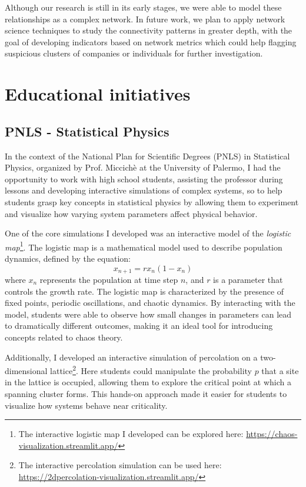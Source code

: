 \documentclass[a4paper, 10pt]{scrartcl}
\begin{document}
Although our research is still in its early stages, we were able to model these relationships as a complex network. In future work, we plan to apply network science techniques to study the connectivity patterns in greater depth, with the goal of developing indicators based on network metrics which could help flagging suspicious clusters of companies or individuals for further investigation.

\section{Educational initiatives}
\subsection*{PNLS - Statistical Physics}
In the context of the National Plan for Scientific Degrees (PNLS) in Statistical Physics, organized by Prof. Miccichè at the University of Palermo, I had the opportunity to work with high school students, assisting the professor during lessons and developing interactive simulations of complex systems, so to help students grasp key concepts in statistical physics by allowing them to experiment and visualize how varying system parameters affect physical behavior.

One of the core simulations I developed was an interactive model of the \textit{logistic map}\footnote{The interactive logistic map I developed can be explored here: \url{https://chaos-visualization.streamlit.app/}}. The logistic map is a mathematical model used to describe population dynamics, defined by the equation:
\begin{equation}
  x_{n+1} = r x_n (1 - x_n)
\end{equation}
where \(x_n\) represents the population at time step \(n\), and \(r\) is a parameter that controls the growth rate. The logistic map is characterized by the presence of fixed points, periodic oscillations, and chaotic dynamics. By interacting with the model, students were able to observe how small changes in parameters can lead to dramatically different outcomes, making it an ideal tool for introducing concepts related to chaos theory.

Additionally, I developed an interactive simulation of percolation on a two-dimensional lattice\footnote{The interactive percolation simulation can be used here: \url{https://2dpercolation-visualization.streamlit.app/}}. Here students could manipulate the probability \(p\) that a site in the lattice is occupied, allowing them to explore the critical point at which a spanning cluster forms. This hands-on approach made it easier for students to visualize how systems behave near criticality.
\end{document}
